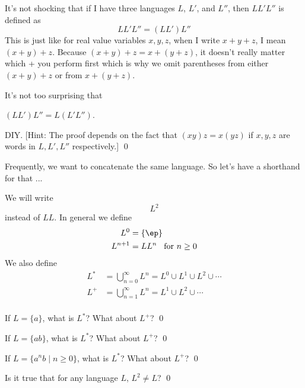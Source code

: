 \newpage
It's not shocking that if I have three languages $L$, $L'$, and $L''$,
then $LL'L''$ is defined as
\[
LL'L'' = (LL')L''
\]
This is just like for real value variables $x,y,z$, when I write
$x + y + z$, I mean $(x + y) + z$.
Because $(x + y) + z = x + (y + z)$, it doesn't really matter
which + you perform first which is why we omit parentheses
from either $(x + y) + z$ or from $x + (y + z)$.

It's not too surprising that

\begin{prop}
$(LL')L'' = L(L'L'')$.
\end{prop}

\proof
DIY.
[Hint: The proof depends on the fact that $(xy)z = x(yz)$ if
$x,y,z$ are words in $L,L',L''$ respectively.]
\qed


\newpage
Frequently, we want to concatenate the same language.
So let's have a shorthand for that ...

We will write 
\[
L^2
\]
instead of $LL$.
In general we define
\begin{align*}
L^0 &= \{\ep\} \\
L^{n+1} &= L L^n \,\,\, \text{ for } n \geq 0
\end{align*}
We also define
\begin{align*}
L^* &= \bigcup_{n = 0}^\infty L^n = L^0 \cup L^1 \cup L^2 \cup \cdots \\
L^+ &= \bigcup_{n = 1}^\infty L^n = L^1 \cup L^2 \cup \cdots \\
\end{align*}


\newpage
\begin{ex}
If $L = \{a\}$, what is $L^*$? What about $L^+$?
\qed
\end{ex}

\begin{ex}
If $L = \{ab\}$, what is $L^*$? What about $L^+$?
\qed
\end{ex}

\begin{ex}
If $L = \{a^nb \mid n \geq 0\}$, what is $L^*$? What about $L^+$?
\qed
\end{ex}

\begin{ex}
Is it true that for any language $L$, $L^2 \neq L$?
\qed
\end{ex}
  


